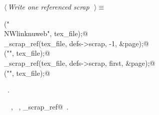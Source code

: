 \documentclass{report}
\begin{document}
\begin{flushleft} \small
\begin{minipage}{\linewidth} \label{scrap232}
$\langle\,${\it Write one referenced scrap}\nobreak\ {\footnotesize {}}$\,\rangle\equiv$
\vspace{-1ex}
\begin{list}{}{} \item
\mbox{}\verb@fputs("\\NWlink{nuweb", tex_file);@\\
\mbox{}\verb@write_scrap_ref(tex_file, defs->scrap, -1, &page);@\\
\mbox{}\verb@fputs("}{", tex_file);@\\
\mbox{}\verb@write_scrap_ref(tex_file, defs->scrap, first, &page);@\\
\mbox{}\verb@fputs("}", tex_file);@{\NWsep}
\end{list}
\vspace{-1ex}
\footnotesize\addtolength{\baselineskip}{-1ex}
\begin{list}{}{\setlength{\itemsep}{-\parsep}\setlength{\itemindent}{-\leftmargin}}
\item \NWtxtMacroRefIn\ .
\end{list}
\vspace{-2ex}
\footnotesize\addtolength{\baselineskip}{-1ex}
\begin{list}{}{\setlength{\itemsep}{-\parsep}\setlength{\itemindent}{-\leftmargin}}
\item \NWtxtIdentsUsed\nobreak\  \verb@first@\nobreak\ , \verb@fputs@\nobreak\ , \verb@write_scrap_ref@\nobreak\ .\end{list}
\end{minipage}\\[4ex]
\end{flushleft}
\end{document}
